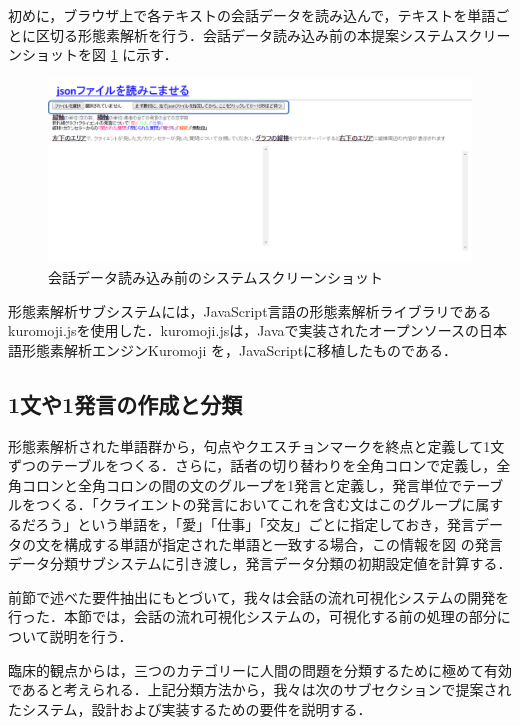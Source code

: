 \documentclass[shuuron]{kuee}
\begin{document}
初めに，ブラウザ上で各テキストの会話データを読み込んで，テキストを単語ごとに区切る形態素解析を行う．会話データ読み込み前の本提案システムスクリーンショットを図
\ref{fig:yomikomimae2}
に示す．
 \begin{figure}
   \begin{center}
     \includegraphics[width=\linewidth]{yomikomimae2.png}
   \end{center}
   \caption{会話データ読み込み前のシステムスクリーンショット}
   \label{fig:yomikomimae2}
 \end{figure}
形態素解析サブシステムには，JavaScript言語の形態素解析ライブラリであるkuromoji.js\cite{kuromojijs}を使用した．kuromoji.jsは，Javaで実装されたオープンソースの日本語形態素解析エンジンKuromoji
を，JavaScriptに移植したものである．

\subsection{1文や1発言の作成と分類}%
形態素解析された単語群から，句点やクエスチョンマークを終点と定義して1文ずつのテーブルをつくる．さらに，話者の切り替わりを全角コロンで定義し，全角コロンと全角コロンの間の文のグループを1発言と定義し，発言単位でテーブルをつくる．「クライエントの発言においてこれを含む文はこのグループに属するだろう」という単語を，「愛」「仕事」「交友」ごとに指定しておき，発言データの文を構成する単語が指定された単語と一致する場合，この情報を図
の発言データ分類サブシステムに引き渡し，発言データ分類の初期設定値を計算する．


前節で述べた要件抽出にもとづいて，我々は会話の流れ可視化システムの開発を行った．本節では，会話の流れ可視化システムの，可視化する前の処理の部分について説明を行う．


  臨床的観点からは，三つのカテゴリーに人間の問題を分類するために極めて有効であると考えられる．上記分類方法から，我々は次のサブセクションで提案されたシステム，設計および実装するための要件を説明する．
\end{document}

